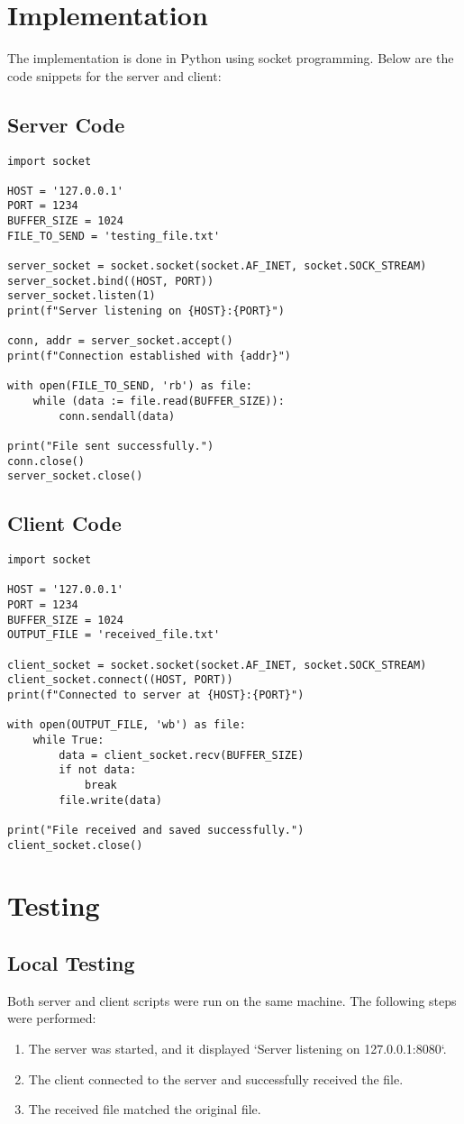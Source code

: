 \documentclass[a4paper,12pt]{article}
\begin{document}
\section*{Implementation}
The implementation is done in Python using socket programming. Below are the code snippets for the server and client:

\subsection*{Server Code}
\begin{lstlisting}
import socket

HOST = '127.0.0.1'
PORT = 1234
BUFFER_SIZE = 1024
FILE_TO_SEND = 'testing_file.txt'

server_socket = socket.socket(socket.AF_INET, socket.SOCK_STREAM)
server_socket.bind((HOST, PORT))
server_socket.listen(1)
print(f"Server listening on {HOST}:{PORT}")

conn, addr = server_socket.accept()
print(f"Connection established with {addr}")

with open(FILE_TO_SEND, 'rb') as file:
    while (data := file.read(BUFFER_SIZE)):
        conn.sendall(data)

print("File sent successfully.")
conn.close()
server_socket.close()
\end{lstlisting}

\subsection*{Client Code}
\begin{lstlisting}
import socket

HOST = '127.0.0.1'
PORT = 1234
BUFFER_SIZE = 1024
OUTPUT_FILE = 'received_file.txt'

client_socket = socket.socket(socket.AF_INET, socket.SOCK_STREAM)
client_socket.connect((HOST, PORT))
print(f"Connected to server at {HOST}:{PORT}")

with open(OUTPUT_FILE, 'wb') as file:
    while True:
        data = client_socket.recv(BUFFER_SIZE)
        if not data:
            break
        file.write(data)

print("File received and saved successfully.")
client_socket.close()
\end{lstlisting}

\section*{Testing}
\subsection*{Local Testing}
Both server and client scripts were run on the same machine. The following steps were performed:
\begin{enumerate}
    \item The server was started, and it displayed `Server listening on 127.0.0.1:8080`.
    \item The client connected to the server and successfully received the file.
    \item The received file matched the original file.
\end{enumerate}
\end{document}
